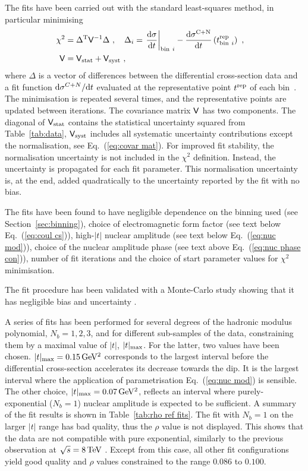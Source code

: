 The fits have been carried out with the standard least-squares method, in particular minimising
\begin{equation}
\label{eq:chi sq A}
	\begin{aligned}
		\chi^2 &= \Delta^\T \mat V^{-1} \Delta\ ,\quad
			\Delta_i = \left.{\d\sigma\over \d t}\right|_{{\rm bin}\ i} - {\d\sigma^{\rm C+N}\over\d t}\left(t^{\rm rep}_{{\rm bin}\ i}\right)\ ,\cr
		\mat V &= \mat V_{\rm stat} + \mat V_{\rm syst}\ ,\cr
	\end{aligned}
\end{equation}
where $\Delta$ is a vector of differences between the differential cross-section data and a fit function ${\rm d}\sigma^{C+N}/{\rm d} t$ evaluated at the representative point $t^{\rm rep}$ of each bin~\cite{lafferty94}. The minimisation is repeated several times, and the representative points are updated between iterations. The covariance matrix $\mathsf{V}$ has two components. The diagonal of $\mathsf{V}_{\rm stat}$ contains the statistical uncertainty squared from Table~\ref{tab:data}, $\mathsf{V}_{\rm syst}$ includes all systematic uncertainty contributions except the normalisation, see Eq.~(\ref{eq:covar mat}). For improved fit stability, the normalisation uncertainty is not included in the $\chi^2$ definition. Instead, the uncertainty is propagated for each fit parameter.  This normalisation uncertainty is, at the end, added quadratically to the uncertainty reported by the fit with no bias.

The fits have been found to have negligible dependence on the binning used (see Section~\ref{sec:binning}), choice of electromagnetic form factor (see text below Eq.~(\ref{eq:coul cs})), high-$|t|$ nuclear amplitude (see text below Eq.~(\ref{eq:nuc mod})), choice of the nuclear amplitude phase (see text above Eq.~(\ref{eq:nuc phase con})), number of fit iterations and the choice of start parameter values for $\chi^2$ minimisation.

The fit procedure has been validated with a Monte-Carlo study showing that it has negligible bias and uncertainty .

A series of fits has been performed for several degrees of the hadronic modulus polynomial, $N_b = 1, 2, 3$, and for different sub-samples of the data, constraining them by a maximal value of $|t|$, $|t|_{\rm max}$. For the latter, two values have been chosen. $|t|_{\rm max} = 0.15\,{\rm GeV^2}$ corresponds to the largest interval before the differential cross-section accelerates its decrease towards the dip. It is the largest interval where the application of parametrisation Eq.~(\ref{eq:nuc mod}) is sensible. The other choice, $|t|_{\rm max} = 0.07\,{\rm GeV^2}$, reflects an interval where purely-exponential ($N_b = 1$) nuclear amplitude is expected to be sufficient. A summary of the fit results is shown in Table~\ref{tab:rho ref fits}. The fit with $N_b = 1$ on the larger $|t|$ range has bad quality, thus the $\rho$ value is not displayed. This shows that the data are not compatible with pure exponential, similarly to the previous observation at $\sqrt s = 8\,{\rm TeV}$ \cite{totem-8tev-90m,totem-8tev-1km}. Except from this case, all other fit configurations yield good quality and $\rho$ values constrained to the range $0.086$ to $0.100$.

